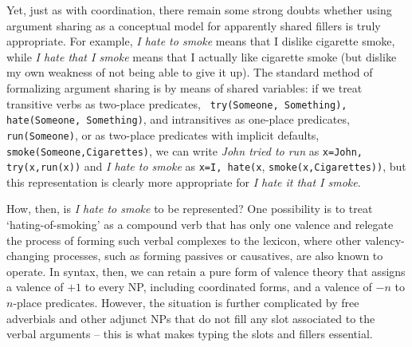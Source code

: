 Yet, just as with coordination, there remain some strong doubts whether using
argument sharing as a conceptual model for apparently shared fillers is truly
appropriate. For example, {\it I hate to smoke} means that I dislike cigarette
smoke, while {\it I hate that I smoke} means that I actually like cigarette
smoke (but dislike my own weakness of not being able to give it up).  The
standard method of formalizing argument sharing is by means of shared
variables: if we treat transitive verbs as two-place predicates, {\tt
  try(Someone, Something), hate(Someone, Something)}, and intransitives as
one-place predicates, {\tt run(Someone)}, or as two-place predicates with
implicit defaults, {\tt smoke(Someone,Cigarettes)}, we can write {\it John
  tried to run} as {\tt x=John, try(x,run(x))} and {\it I hate to smoke} as
{\tt x=I, hate(x}, {\tt smoke(x,Cigarettes))}, but this representation is
clearly more appropriate for {\it I hate it that I smoke}.

How, then, is {\it I hate to smoke} to be represented? One possibility is to
treat `hating-of-smoking' as a compound verb that has only one valence and
relegate the process of forming such verbal complexes to the lexicon, where
other valency-changing processes, such as forming passives or causatives, are
also known to operate. In syntax, then, we can retain a pure form of valence
theory that assigns a valence of $+1$ to every NP, including coordinated
forms, and a valence of $-n$ to $n$-place predicates.  However, the situation
is further complicated by free adverbials and other adjunct NPs that do not 
fill any slot associated to the verbal arguments -- this is what makes typing 
the slots and fillers essential.

